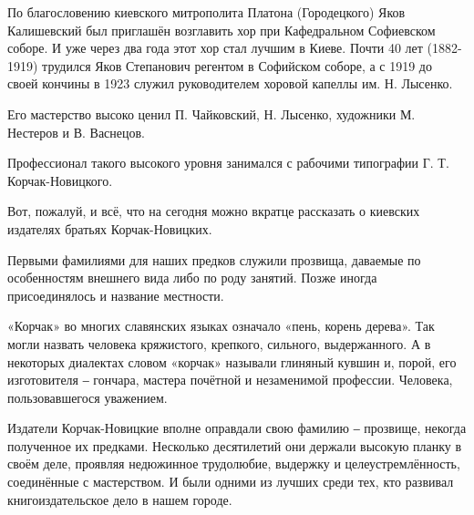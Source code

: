 По благословению киевского митрополита Платона (Городецкого) Яков Калишевский
был приглашён возглавить хор при Кафедральном Софиевском соборе. И уже через
два года этот хор стал лучшим в Киеве. Почти 40 лет (1882-1919) трудился Яков
Степанович регентом в Софийском соборе, а с 1919 до своей кончины в 1923 служил
руководителем хоровой капеллы им. Н. Лысенко.

Его мастерство высоко ценил П. Чайковский, Н. Лысенко, художники М. Нестеров и
В. Васнецов. 

Профессионал такого высокого уровня занимался с рабочими типографии
Г. Т. Корчак-Новицкого.

Вот, пожалуй, и всё, что на сегодня можно вкратце рассказать о киевских
издателях братьях Корчак-Новицких.

Первыми фамилиями для наших предков служили прозвища, даваемые по особенностям
внешнего вида либо по роду занятий. Позже иногда присоединялось и название
местности.

«Корчак» во многих славянских языках означало «пень, корень дерева». Так могли
назвать человека кряжистого, крепкого, сильного, выдержанного. А в некоторых
диалектах словом «корчак» называли глиняный кувшин и, порой, его изготовителя ‒
гончара, мастера почётной и незаменимой профессии. Человека, пользовавшегося
уважением.

Издатели Корчак-Новицкие вполне оправдали свою фамилию ‒ прозвище, некогда
полученное их предками. Несколько десятилетий они держали высокую планку в
своём деле, проявляя недюжинное трудолюбие, выдержку и целеустремлённость,
соединённые с мастерством. И были одними из лучших среди тех, кто развивал
книгоиздательское дело в нашем городе.
